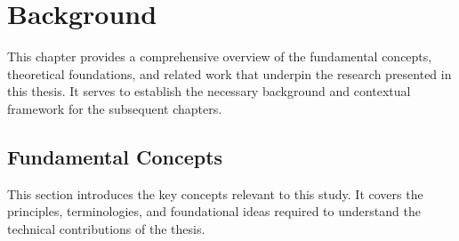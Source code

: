 \chapter{Background}
\label{chapter2}

\begin{paragraph}
This chapter provides a comprehensive overview of the fundamental concepts, theoretical foundations, and related work that underpin the research presented in this thesis. It serves to establish the necessary background and contextual framework for the subsequent chapters.
\end{paragraph}

\section{Fundamental Concepts}

\begin{paragraph}
This section introduces the key concepts relevant to this study. It covers the principles, terminologies, and foundational ideas required to understand the technical contributions of the thesis.
\end{paragraph}
